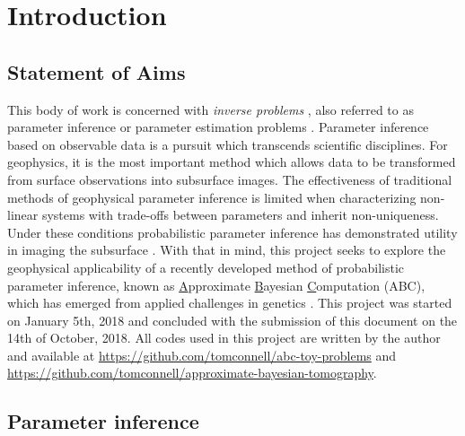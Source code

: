 \chapter{Introduction}


\section{Statement of Aims} 

This body of work is concerned with \textit{inverse problems} \citep{Tarantola2005,Aster2013,Menke2012,Kaipio2006,Biegler2010,Idier2013}, also referred to as parameter inference or parameter estimation problems \citep{Box1973,Sprott2008,Casella1993,Cox2007}. Parameter inference based on observable data is a pursuit which transcends scientific disciplines. For geophysics, it is the most important method which allows data to be transformed from surface observations into subsurface images. The effectiveness of traditional methods of geophysical parameter inference is limited when characterizing non-linear systems with trade-offs between parameters and inherit non-uniqueness. Under these conditions probabilistic parameter inference has demonstrated utility in imaging the subsurface \citep{Tarantola2005}. With that in mind, this project seeks to explore the geophysical applicability of a recently developed method of probabilistic parameter inference, known as \underline{A}pproximate \underline{B}ayesian \underline{C}omputation (ABC), which has emerged from applied challenges in genetics \citep{Tavare1997,Beaumont2002,Sunnaker2013}. This project was started on January 5th, 2018 and concluded with the submission of this document on the 14th of October, 2018. All codes used in this project are written by the author and available at \url{https://github.com/tomconnell/abc-toy-problems} and \url{https://github.com/tomconnell/approximate-bayesian-tomography}.

\section{Parameter inference}

